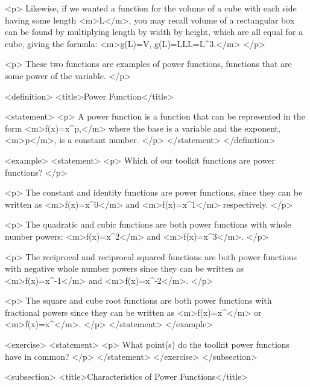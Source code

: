         <p>
            Likewise, if we wanted a function for the volume of a cube with each side having some length <m>L</m>, you may recall volume of a rectangular box can be found by multiplying length by width by height, which are all equal for a cube, giving the formula: <m>g(L)=V, g(L)=L\times L\times L=L^{3}.</m>
        </p>

        <p>
            These two functions are examples of power functions, functions that are some power of the variable.
        </p>

        <definition>
            <title>Power Function</title>

            <statement>
                <p>
                    A power function is a function that can be represented in the form <m>f(x)=x^{p},</m> where the base is a variable and the exponent, <m>p</m>, is a constant number.
                </p>
            </statement>
        </definition>

        <example>
            <statement>
                <p>
                    Which of our toolkit functions are power functions?
                </p>

                <p>
                    The constant and identity functions are power functions, since they can be written as <m>f(x)=x^{0}</m> and <m>f(x)=x^{1}</m> respectively.
                </p>

                <p>
                    The quadratic and cubic functions are both power functions with whole number powers: <m>f(x)=x^{2}</m> and <m>f(x)=x^{3}</m>.
                </p>

                <p>
                    The reciprocal and reciprocal squared functions are both power functions with negative whole number powers since they can be written as <m>f(x)=x^{-1}</m> and <m>f(x)=x^{-2}</m>.
                </p>

                <p>
                    The square and cube root functions are both power functions with fractional powers since they can be written as <m>f(x)=x^{}</m> or <m>f(x)=x^{}</m>.
                </p>
            </statement>
        </example>

        <exercise>
            <statement>
                <p>
                    What point(s) do the toolkit power functions have in common?
                </p>
            </statement>
        </exercise>
    </subsection>


    <subsection>
        <title>Characteristics of Power Functions</title>


